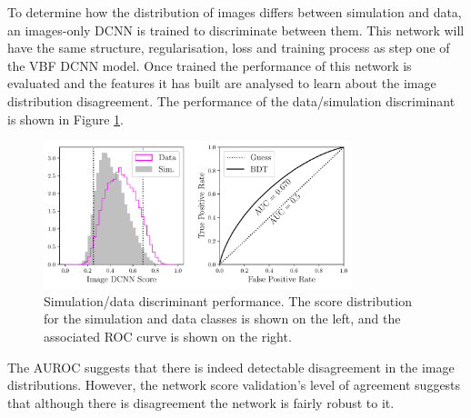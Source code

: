To determine how the distribution of images differs between simulation and data, an images-only DCNN is trained to discriminate between them.
This network will have the same structure, regularisation, loss and training process as step one of the VBF DCNN model. 
Once trained the performance of this network is evaluated and the features it has built are analysed to learn about the image distribution disagreement.  
The performance of the data/simulation discriminant is shown in Figure \ref{fig:event_categorisation:zee_disc_perf}.
\begin{figure}[h!]
    \centering
    \includegraphics[width=0.8\textwidth]{figures/event_selection/ROC_Zee_img_DCNN.pdf}
    \caption{\Zee Simulation/data discriminant performance. The score distribution for the simulation and data classes is shown on the left, and the associated ROC curve is shown on the right.} 
    \label{fig:event_categorisation:zee_disc_perf}
\end{figure}

The AUROC suggests that there is indeed detectable disagreement in the image distributions. 
However, the network score validation's level of agreement suggests that although there is disagreement the network is fairly robust to it. 

